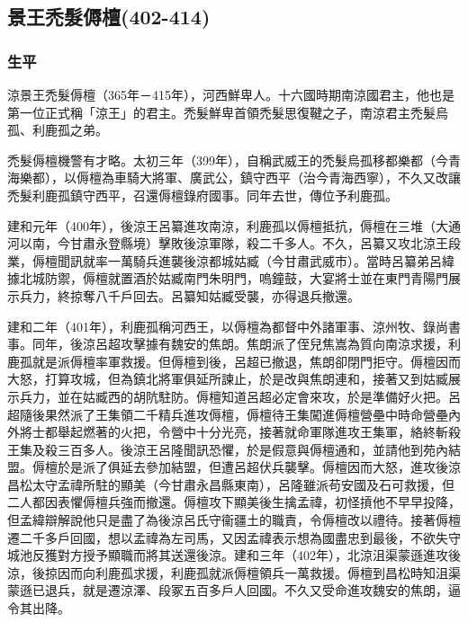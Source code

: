 
\subsection{景王禿髮傉檀\tiny(402-414)}

\subsubsection{生平}

涼景王禿髮傉檀（365年－415年），河西鮮卑人。十六國時期南涼國君主，他也是第一位正式稱「涼王」的君主。禿髮鮮卑首領禿髮思復鞬之子，南涼君主禿髮烏孤、利鹿孤之弟。

禿髮傉檀機警有才略。太初三年（399年），自稱武威王的禿髮烏孤移都樂都（今青海樂都），以傉檀為車騎大將軍、廣武公，鎮守西平（治今青海西寧），不久又改讓禿髮利鹿孤鎮守西平，召還傉檀錄府國事。同年去世，傳位予利鹿孤。

建和元年（400年），後涼王呂纂進攻南涼，利鹿孤以傉檀抵抗，傉檀在三堆（大通河以南，今甘肅永登縣境）擊敗後涼軍隊，殺二千多人。不久，呂纂又攻北涼王段業，傉檀聞訊就率一萬騎兵進襲後涼都城姑臧（今甘肅武威市）。當時呂纂弟呂緯據北城防禦，傉檀就置酒於姑臧南門朱明門，嗚鐘鼓，大宴將士並在東門青陽門展示兵力，終掠奪八千戶回去。呂纂知姑臧受襲，亦得退兵撤還。

建和二年（401年），利鹿孤稱河西王，以傉檀為都督中外諸軍事、涼州牧、錄尚書事。同年，後涼呂超攻擊據有魏安的焦朗。焦朗派了侄兒焦嵩為質向南涼求援，利鹿孤就是派傉檀率軍救援。但傉檀到後，呂超已撤退，焦朗卻閉門拒守。傉檀因而大怒，打算攻城，但為鎮北將軍俱延所諫止，於是改與焦朗連和，接著又到姑臧展示兵力，並在姑臧西的胡阬駐防。傉檀知道呂超必定會來攻，於是準備好火把。呂超隨後果然派了王集領二千精兵進攻傉檀，傉檀待王集闖進傉檀營壘中時命營壘內外將士都舉起燃著的火把，令營中十分光亮，接著就命軍隊進攻王集軍，絡終斬殺王集及殺三百多人。後涼王呂隆聞訊恐懼，於是假意與傉檀通和，並請他到苑內結盟。傉檀於是派了俱延去參加結盟，但遭呂超伏兵襲擊。傉檀因而大怒，進攻後涼昌松太守孟禕所駐的顯美（今甘肅永昌縣東南），呂隆雖派苟安國及石可救援，但二人都因表懼傉檀兵強而撤還。傉檀攻下顯美後生擒孟禕，初怪摃他不早早投降，但孟緯辯解說他只是盡了為後涼呂氏守衞疆土的職責，令傉檀改以禮待。接著傉檀遷二千多戶回國，想以孟禕為左司馬，又因孟禕表示想為國盡忠到最後，不欲失守城池反獲對方授予顯職而將其送還後涼。建和三年（402年），北涼沮渠蒙遜進攻後涼，後掠因而向利鹿孤求援，利鹿孤就派傉檀領兵一萬救援。傉檀到昌松時知沮渠蒙遜已退兵，就是遷涼澤、段冢五百多戶人回國。不久又受命進攻魏安的焦朗，逼令其出降。

